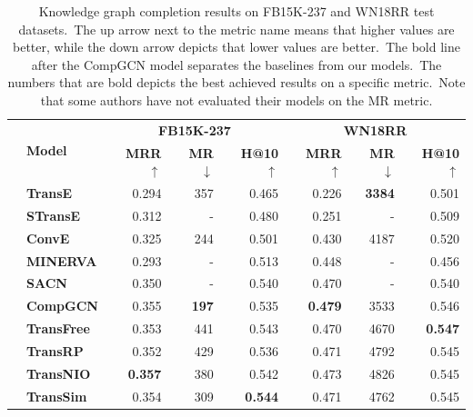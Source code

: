 \documentclass[longabstract, english, mgr]{iithesis}
\theoremstyle{default_theorem_style}\newtheorem{theorem}{Theorem}
\theoremstyle{default_theorem_style}\newtheorem{definition}{Definition}
\begin{document}
\begin{table}[!t]
\centering
\def\arraystretch{1.1}
\begin{tabular}{| l | l || r | r | r || r | r | r |}
 \hline
 \multirow{2}{*}{} & \multirow{2}{*}{\textbf{\small{Model}}} & \multicolumn{3}{c||}{\textbf{\small{FB15K-237}}} &
 \multicolumn{3}{c|}{\textbf{\small{WN18RR}}} \\
 \cline{3-8}
 & & \small{\textbf{MRR} $\uparrow$} & \small{\textbf{MR} $\downarrow$} & \small{\textbf{H@10} $\uparrow$} &
 \small{\textbf{MRR} $\uparrow$} & \small{\textbf{MR} $\downarrow$} & \small{\textbf{H@10} $\uparrow$} \\
 \Xhline{5\arrayrulewidth}
 \multirow{6}{*}{\rotatebox[origin=c]{90}{\textbf{\scriptsize{Baselines}}}} & \textbf{TransE \cite{transe_model}} &
 0.294 & 357 & 0.465 & 0.226 &
 \textbf{3384} & 0.501 \\
 \cline{2-8}
 & \small{\textbf{STransE \cite{stranse_model}}} & 0.312 & - & 0.480 & 0.251 & - & 0.509 \\
 \cline{2-8}
 & \small{\textbf{ConvE \cite{conve_model}}} & 0.325 & 244 & 0.501 & 0.430 & 4187 & 0.520 \\
 \cline{2-8}
 & \small{\textbf{MINERVA \cite{go_for_a_walk_model}}} & 0.293 & - & 0.513 & 0.448 & - & 0.456 \\
 \cline{2-8}
 & \small{\textbf{SACN \cite{sacn_model}}} & 0.350 & - & 0.540 & 0.470 & - & 0.540 \\
 \cline{2-8}
 & \small{\textbf{CompGCN \cite{comp_gcn_model}}} & 0.355 & \textbf{197} & 0.535 & \textbf{0.479} & 3533 & 0.546 \\
 \Xhline{3\arrayrulewidth}
 \multirow{4}{*}{\rotatebox[origin=c]{90}{\textbf{\scriptsize{Ours}}}} & \small{\textbf{TransFree}} & 0.353 & 441 &
 0.543 & 0.470 & 4670 &
 \textbf{0.547} \\
 \cline{2-8}
 & \small{\textbf{TransRP}} & 0.352 & 429 & 0.536 & 0.471 & 4792 & 0.545 \\
 \cline{2-8}
 & \small{\textbf{TransNIO}} & \textbf{0.357} & 380 & 0.542 & 0.473 & 4826 & 0.545 \\
 \cline{2-8}
 & \small{\textbf{TransSim}} & 0.354 & 309 & \textbf{0.544} & 0.471 & 4762 & 0.545 \\
 \hline
\end{tabular}
\caption{Knowledge graph completion results on FB15K-237 and WN18RR test datasets.\ The up arrow next to the metric
name means that higher values are better, while the down arrow depicts that lower values are better.\ The bold line
after the CompGCN model separates the baselines from our models.\ The numbers that are bold depicts the best achieved
results on a specific metric.\ Note that some authors have not evaluated their models on the MR metric.}
\label{tab:full_results}
\end{table}
\end{document}
